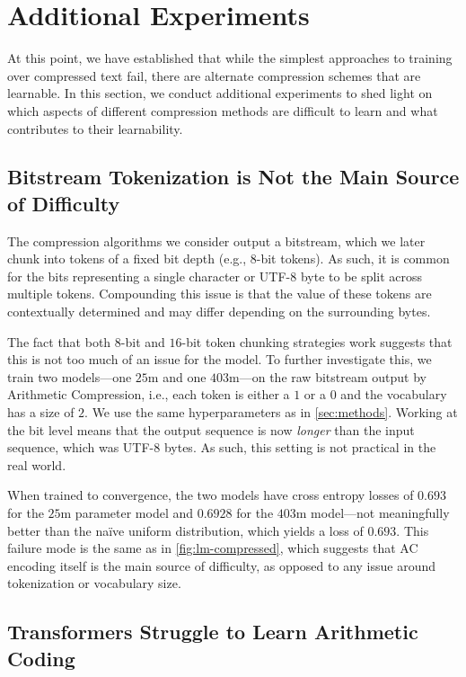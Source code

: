 \section{Additional Experiments}
\label{sec:ablations}

At this point, we have established that while the simplest approaches to training over compressed text fail, there are alternate compression schemes that are learnable. In this section, we conduct additional experiments to shed light on which aspects of different compression methods are difficult to learn and what contributes to their learnability.

\subsection{Bitstream Tokenization is Not the Main Source of Difficulty}

The compression algorithms we consider output a bitstream, which we later chunk into tokens of a fixed bit depth (e.g., $8$-bit tokens). As such, it is common for the bits representing a single character or UTF-8 byte to be split across multiple tokens. Compounding this issue is that the value of these tokens are contextually determined and may differ depending on the surrounding bytes.

The fact that both $8$-bit and $16$-bit token chunking strategies work suggests that this is not too much of an issue for the model. To further investigate this, we train two models---one $25$m and one $403$m---on the raw bitstream output by Arithmetic Compression, i.e., each token is either a $1$ or a $0$ and the vocabulary has a size of $2$. We use the same hyperparameters as in \ref{sec:methods}. Working at the bit level means that the output sequence is now \textit{longer} than the input sequence, which was UTF-8 bytes. As such, this setting is not practical in the real world.

When trained to convergence, the two models have cross entropy losses of $0.693$ for the $25$m parameter model and $0.6928$ for the $403$m model---not meaningfully better than the naïve uniform distribution, which yields a loss of $0.693$. This failure mode is the same as in \ref{fig:lm-compressed}, which suggests that AC encoding itself is the main source of difficulty, as opposed to any issue around tokenization or vocabulary size.

\subsection{Transformers Struggle to Learn Arithmetic Coding}
\label{sec:subtasks}

